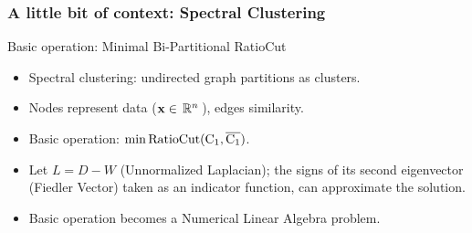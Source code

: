 \begin{frame}
  \frametitle{A little bit of context: Spectral Clustering}
  \begin{block}{Basic operation: Minimal Bi-Partitional RatioCut}
    \begin{itemize}
    \item Spectral clustering: undirected graph partitions as clusters.
    \item Nodes represent data ($\mathbf{x} \in \,\mathbb{R}^{n}\,$), edges similarity.
    \item Basic operation: $\min \operatorname{RatioCut(C_1,\overline{C_1})}$.
    \item Let $L = D - W$ (Unnormalized Laplacian); the signs of its second eigenvector (Fiedler Vector) taken as an indicator function, can approximate the solution.
    \item Basic operation becomes a Numerical Linear Algebra problem.
    \end{itemize}
  \end{block}  
\end{frame}
